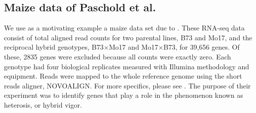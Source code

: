 \begin{table}[ht]
\centering
\begin{minipage}{.8\textwidth}
\caption{\small Selected rows from RNA-seq data set showing total aligned read counts for selected genes. Columns are grouped by genotype. Genes were selected as exemplars for different types of heterosis as defined in Section \ref{intro-paschold}. Plots of the data are shown in Figure \ref{exemplars}.}
\label{counts}
\end{minipage}
\end{table}

\subsection{Maize data of Paschold et al.}
\label{intro-paschold}
We use as a motivating example a maize data set due to \citep{paschold}. These RNA-seq data consist of total aligned read counts for two parental lines, B73 and Mo17, and the reciprocal hybrid genotypes, B73$\times$Mo17 and Mo17$\times$B73, for 39,656 genes. Of these, 2835 genes were excluded because all counts were exactly zero. Each genotype had four biological replicates measured with Illumina methodology and equipment. Reads were mapped to the whole reference genome using the short reads aligner, NOVOALIGN. For more specifics, please see \cite{paschold}. The purpose of their experiment was to identify genes that play a role in the phenomenon known as heterosis, or hybrid vigor.

